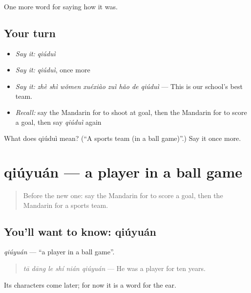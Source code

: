 \begin{grammarlens}[title={What you've built}]
One more word for saying how it was.
\end{grammarlens}

\subsection*{Your turn}
\begin{itemize}
\raggedright
  \item \emph{Say it:} \emph{qiúduì}
  \item \emph{Say it:} \emph{qiúduì}, once more
  \item \emph{Say it:} \emph{zhè shì wǒmen xuéxiào zuì hǎo de qiúduì} — This is our school's best team.
  \item \emph{Recall:} say the Mandarin for to shoot at goal, then the Mandarin for to score a goal, then say \emph{qiúduì} again
\end{itemize}

\begin{tcolorbox}[breakable,colback=teal!4,colframe=teal!35!black,title={Before you move on}]
What does qiúduì mean? (\textquotedblleft{}A sports team (in a ball game)\textquotedblright{}.) Say it once more.
\end{tcolorbox}
\section[qiúyuán]{qiúyuán — a player in a ball game}

\label{lesson:ZH-C499-qiuyuan}



\begin{quote}
Before the new one: say the Mandarin for to score a goal, then the Mandarin for a sports team.
\end{quote}

\subsection*{You'll want to know: qiúyuán}
\emph{qiúyuán} — \textquotedblleft{}a player in a ball game\textquotedblright{}.

\begin{quote}
\emph{tā dāng le shí nián qiúyuán} — He was a player for ten years.
\end{quote}

Its characters come later; for now it is a word for the ear.

